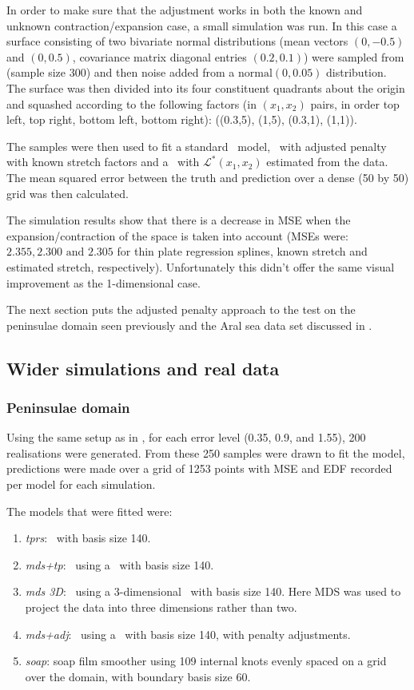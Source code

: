 In order to make sure that the adjustment works in both the known and unknown contraction/expansion case, a small simulation was run. In this case a surface consisting of two bivariate normal distributions (mean vectors $(0,-0.5)$ and $(0,0.5)$, covariance matrix diagonal entries $(0.2,0.1)$) were sampled from (sample size 300) and then noise added from a $\text{normal}(0,0.05)$ distribution. The surface was then divided into its four constituent quadrants about the origin and squashed according to the following factors (in $(x_1,x_2)$ pairs, in order top left, top right, bottom left, bottom right): ((0.3,5), (1,5), (0.3,1), (1,1)).

The samples were then used to fit a standard \tprs\ model, \tprs\ with adjusted penalty with known stretch factors and a \tprs\ with $\mathcal{L}^*(x_1,x_2)$ estimated from the data. The mean squared error between the truth and prediction over a dense (50 by 50) grid was then calculated.

The simulation results show that there is a decrease in MSE when the expansion/contraction of the space is taken into account (MSEs were: $2.355, 2.300 \text{ and } 2.305$ for thin plate regression splines, known stretch and estimated stretch, respectively). Unfortunately this didn't offer the same visual improvement as the 1-dimensional case.

The next section puts the adjusted penalty approach to the test on the peninsulae domain seen previously and the Aral sea data set discussed in .

\subsection{Wider simulations and real data}

\subsubsection{Peninsulae domain}
\label{wt2bigsim}

Using the same setup as in , for each error level (0.35, 0.9, and 1.55), 200 realisations were generated. From these 250 samples were drawn to fit the model, predictions were made over a grid of 1253 points with MSE and EDF recorded per model for each simulation. 

The models that were fitted were:
\begin{enumerate}
\item \emph{tprs}: \tprs\ with basis size 140.
\item \emph{mds+tp}: \mdsap\ using a \tprs\ with basis size 140.
\item \emph{mds 3D}: \mdsap\ using a 3-dimensional \tprs\ with basis size 140. Here MDS was used to project the data into three dimensions rather than two.
\item \emph{mds+adj}: \mdsap\ using a \tprs\ with basis size 140, with penalty adjustments.
\item \emph{soap}: soap film smoother using 109 internal knots evenly spaced on a grid over the domain, with boundary basis size 60.
\end{enumerate}

